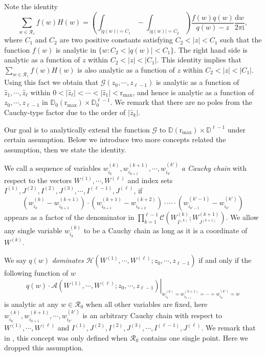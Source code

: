 \documentclass{article}
\numberwithin{equation}{section}
\newcommand{\Ch}{\mathcal{C}}
\newcommand{\ddbar}[2]{\frac{{\mathrm d}#1}{2\pi {\mathrm i}#2}}
\newcommand{\rr}{\mathrm{r_{max}}}
\begin{document}
Note the identity
\begin{equation}
	\label{eq:2021_12_31_01}
	\sum_{w\in\mathcal{R}_z}f(w)H(w)= \left(\int_{|q(w)|=C_1}-\int_{|q(w)|=C_2}\right)\frac{f(w)q(w)}{q(w)-z}\ddbar{w}{},
\end{equation}
where $C_1$ and $C_2$ are two positive constants satisfying  $C_2<|z|<C_1$ such that the function $f(w)$ is analytic in $\{w: C_2< |q(w)| < C_1\}$. The right hand side is analytic as a function of $z$ within $C_2<|z|<|C_1|$. This identity implies that $\sum_{w\in\mathcal{R}_z}f(w)H(w)$ is also analytic as a function of $z$ within $C_2<|z|<|C_1|$. Using this fact we obtain that $\mathcal{G}(z_0,\cdots,z_{\ell-1})$
is analytic as a function of $\hat z_1,\cdots,\hat z_\ell$ within $0<|\hat z_\ell|<\cdots<|\hat z_1|<\rr$, and hence is analytic as a function of $z_0,\cdots,z_{\ell-1}$ in $\mathbb{D}_0(\rr)\times \mathbb{D}_0^{\ell-1}$. %
We remark that there are no poles from the Cauchy-type factor due to the order of $|\hat z_k|$.%

Our goal is to analytically extend the function $\mathcal{G}$ to $\mathbb{D}(\rr)\times\mathbb{D}^{\ell-1}$ under certain assumption. Below we introduce two more concepts related the assumption, then we state the identity.

We call a sequence of variables $w_{i_k}^{(k)},w_{i_{k+1}}^{(k+1)},\cdots,w_{i_{k'}}^{(k')}$ \emph{a Cauchy chain} with respect to the vectors $W^{(1)},\cdots, W^{(\ell)}$ and index sets $I^{(1)},J^{(2)},I^{(2)},J^{(3)},\cdots, I^{(\ell-1)}, J^{(\ell)}$, if 
\begin{equation*}
	\left(w_{i_k}^{(k)} -w_{i_{k+1}}^{(k+1)}\right)\cdot
	\left(w_{i_{k+1}}^{(k+1)} -w_{i_{k+2}}^{(k+2)}\right)
	\cdot\cdots \cdot
	\left(w_{i_{k'-1}}^{(k'-1)} -w_{i_{k'}}^{(k')}\right)
\end{equation*}
appears as a factor of the denominator in $\prod_{k=1}^{\ell-1} \Ch\left( W_{I^{(k)}}^{(k)};  W_{J^{(k+1)}}^{(k+1)}\right)$. We allow any single variable $w_{i_k}^{(k)}$ to be a Cauchy chain as long as it is a coordinate of $W^{(k)}$.

We say $q(w)$ \emph{dominates} $\mathcal{H}\left(W^{(1)},\cdots,W^{(\ell)};z_0,\cdots,z_{\ell-1}\right)$ if and only if the following function of $w$
\begin{equation}
	\left.q(w)\cdot \mathcal{A}\left(W^{(1)},\cdots,W^{(\ell)};z_0,\cdots,z_{\ell-1}\right)\right|_{w_{i_k}^{(k)}=w_{i_{k+1}}^{(k+1)}=\cdots=w_{i_{k'}}^{(k')}=w}
\end{equation}
is analytic at any $w\in\mathcal{R}_0$ when all other variables are fixed, here $w_{i_k}^{(k)},w_{i_{k+1}}^{(k+1)},\cdots,w_{i_{k'}}^{(k')}$ is an arbitrary Cauchy chain with respect to $W^{(1)},\cdots, W^{(\ell)}$ and $I^{(1)},J^{(2)},I^{(2)},J^{(3)},\cdots, I^{(\ell-1)}, J^{(\ell)}$. We remark that in \cite{Liu19}, this concept was only defined when $\mathcal{R}_0$ contains one single point. Here we dropped this assumption.
\end{document}
